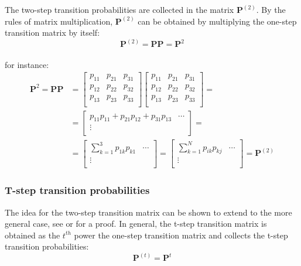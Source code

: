 \noindent The two-step transition probabilities are collected in the matrix $\mathbf{P}^{(2)}$. By the rules of matrix multiplication,  $\mathbf{P}^{(2)}$ can be obtained by multiplying the one-step transition matrix by itself:
\begin{equation}
    \mathbf{P}^{(2)} = \mathbf{P} \mathbf{P} = \mathbf{P}^2 
\end{equation}\\
for instance:
\begin{equation}
\begin{split}
  \mathbf{P}^2 = \mathbf{P} \mathbf{P} &= 
\begin{bmatrix}
p_{11} & p_{21} & p_{31} \\
p_{12} & p_{22} & p_{32}  \\
p_{13} & p_{23} & p_{33}  \\
\end{bmatrix}
\begin{bmatrix}
p_{11} & p_{21} & p_{31} \\
p_{12} & p_{22} & p_{32}  \\
p_{13} & p_{23} & p_{33}  \\
\end{bmatrix}=\\
&= 
\begin{bmatrix}
p_{11}p_{11} + p_{21}p_{12} + p_{31}p_{13} & \cdots \\
\vdots\\
\end{bmatrix} =\\
&= 
\begin{bmatrix}
\sum_{k=1}^3 p_{1k}p_{k1} & \cdots\\
\vdots\\
\end{bmatrix} = 
\begin{bmatrix}
\sum_{k=1}^N p_{ik}p_{kj} & \cdots\\
\vdots\\
\end{bmatrix} = 
\mathbf{P}^{(2)} 
\end{split}
\end{equation}




\subsubsection{T-step transition probabilities }

The idea for the two-step transition matrix can be shown to extend to the more general case, see \cite{Sheskin2010} or \cite{Holmes2015} for a proof. In general, the t-step transition matrix is obtained as the  $t^{th}$ power the one-step transition matrix and collects the t-step transition probabilities:
\begin{equation}
    \mathbf{P}^{(t)} = \mathbf{P}^t
\end{equation}



